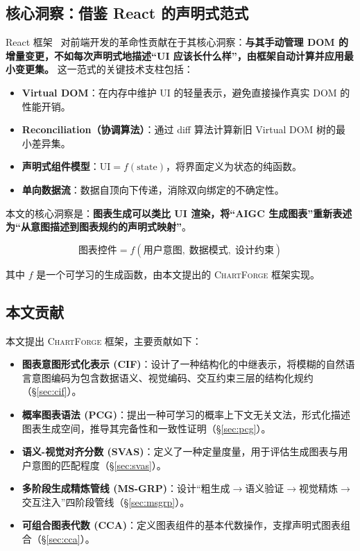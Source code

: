 \documentclass[12pt,a4paper]{ctexart}
\theoremstyle{remark}
\newcommand{\ChartForge}{\textsc{ChartForge}}
\begin{document}
\subsection{核心洞察：借鉴 React 的声明式范式}

React 框架~\cite{walke2013react} 对前端开发的革命性贡献在于其核心洞察：\textbf{与其手动管理 DOM 的增量变更，不如每次声明式地描述“UI 应该长什么样”，由框架自动计算并应用最小变更集。} 这一范式的关键技术支柱包括：

\begin{itemize}[leftmargin=*]
    \item \textbf{Virtual DOM}：在内存中维护 UI 的轻量表示，避免直接操作真实 DOM 的性能开销。
    \item \textbf{Reconciliation（协调算法）}：通过 diff 算法计算新旧 Virtual DOM 树的最小差异集。
    \item \textbf{声明式组件模型}：$\text{UI} = f(\text{state})$，将界面定义为状态的纯函数。
    \item \textbf{单向数据流}：数据自顶向下传递，消除双向绑定的不确定性。
\end{itemize}

本文的核心洞察是：\textbf{图表生成可以类比 UI 渲染，将“AIGC 生成图表”重新表述为“从意图描述到图表规约的声明式映射”}。

\begin{equation}
    \text{图表控件} = f(\text{用户意图},\; \text{数据模式},\; \text{设计约束})
\end{equation}

其中 $f$ 是一个可学习的生成函数，由本文提出的 \ChartForge{} 框架实现。

\subsection{本文贡献}

本文提出 \ChartForge{} 框架，主要贡献如下：

\begin{itemize}[leftmargin=*, itemsep=2pt]
    \item[C1.] \textbf{图表意图形式化表示 (CIF)}：设计了一种结构化的中继表示，将模糊的自然语言意图编码为包含数据语义、视觉编码、交互约束三层的结构化规约（\S\ref{sec:cif}）。
    \item[C2.] \textbf{概率图表语法 (PCG)}：提出一种可学习的概率上下文无关文法，形式化描述图表生成空间，推导其完备性和一致性证明（\S\ref{sec:pcg}）。
    \item[C3.] \textbf{语义-视觉对齐分数 (SVAS)}：定义了一种定量度量，用于评估生成图表与用户意图的匹配程度（\S\ref{sec:svas}）。
    \item[C4.] \textbf{多阶段生成精炼管线 (MS-GRP)}：设计“粗生成$\to$语义验证$\to$视觉精炼$\to$交互注入”四阶段管线（\S\ref{sec:msgrp}）。
    \item[C5.] \textbf{可组合图表代数 (CCA)}：定义图表组件的基本代数操作，支撑声明式图表组合（\S\ref{sec:cca}）。
\end{itemize}
\end{document}
